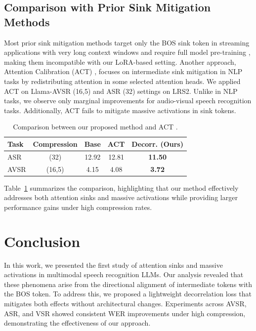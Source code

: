 \documentclass{article}
\begin{document}
\subsection{Comparison with Prior Sink Mitigation Methods}
Most prior sink mitigation methods target only the BOS sink token in streaming applications with very long context windows and require full model pre-training \cite{xiao2023streamingllm, zuhri2025softpick}, making them incompatible with our LoRA-based setting. Another approach, Attention Calibration (ACT) \cite{yu2024unveiling}, focuses on intermediate sink mitigation in NLP tasks by redistributing attention in some selected attention heads. We applied ACT on Llama-AVSR (16,5) and ASR (32) settings on LRS2. Unlike in NLP tasks, we observe only marginal improvements for audio-visual speech recognition tasks. Additionally, ACT fails to mitigate massive activations in sink tokens.
\begin{table}[t]
    \centering
    \caption{Comparison between our proposed method and ACT \cite{yu2024unveiling}.}
    \begin{tabular}{lcccc}
        \toprule
        \textbf{Task} & \textbf{Compression} & \textbf{Base} & \textbf{ACT} & \textbf{Decorr. (Ours)} \\
        \midrule
        ASR & (32) & 12.92 & 12.81 & \textbf{11.50} \\
        \hdashline
        AVSR & (16,5) & 4.15 & 4.08 & \textbf{3.72} \\
        \bottomrule
    \end{tabular}
    \label{tab:act_comparison}
    \vspace{-0.3cm}
    
\end{table}
Table~\ref{tab:act_comparison} summarizes the comparison, highlighting that our method effectively addresses both attention sinks and massive activations while providing larger performance gains under high compression rates.




\section{Conclusion}
In this work, we presented the first study of attention sinks and massive activations in multimodal speech recognition LLMs. Our analysis revealed that these phenomena arise from the directional alignment of intermediate tokens with the BOS token. To address this, we proposed a lightweight decorrelation loss that mitigates both effects without architectural changes. Experiments across AVSR, ASR, and VSR showed consistent WER improvements under high compression, demonstrating the effectiveness of our approach.
\end{document}
